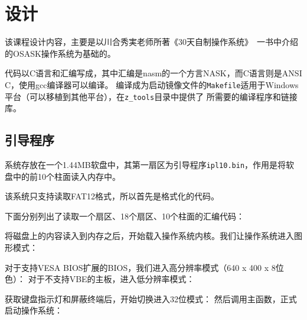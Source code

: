 \section{设计}

该课程设计内容，主要是以{\ja 川合秀実}老师所著《30天自制操作系统》\cite{osask}~一书中介绍的OSASK操作系统为基础的。

代码以C语言和汇编写成，其中汇编是nasm的一个方言NASK，而C语言则是ANSI C，使用gcc编译器可以编译。
编译成为启动镜像文件的\verb|Makefile|适用于Windows平台（可以移植到其他平台），在\verb|z_tools|目录中提供了
所需要的编译程序和链接库。


\subsection{引导程序}
\label{sub:引导程序}


系统存放在一个1.44MB软盘中，其第一扇区为引导程序\verb|ipl10.bin|，作用是将软盘中的前10个柱面读入内存中。

该系统只支持读取FAT12格式，所以首先是格式化的代码。
{\linespread{1}}

下面分别列出了读取一个扇区、18个扇区、10个柱面的汇编代码：
{\linespread{1}}
{\linespread{1}}
{\linespread{1}}

将磁盘上的内容读入到内存之后，开始载入操作系统内核。我们让操作系统进入图形模式：
{\linespread{1}}

对于支持VESA BIOS扩展的BIOS，我们进入高分辨率模式（640 x 400 x 8位色）：
{\linespread{1}}
对于不支持VBE的主板，进入低分辨率模式：
{\linespread{1}}

获取键盘指示灯和屏蔽终端后，开始切换进入32位模式：
{\linespread{1}}
然后调用主函数，正式启动操作系统：
{\linespread{1}}

